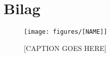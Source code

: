\chapter{Bilag}\label{ch:bilag}

\begin{figure}
    \texttt{[image: figures/[NAME]]}
    \caption{[CAPTION GOES HERE]}
    \label{fig:[LABEL GOES HERE]}
\end{figure}